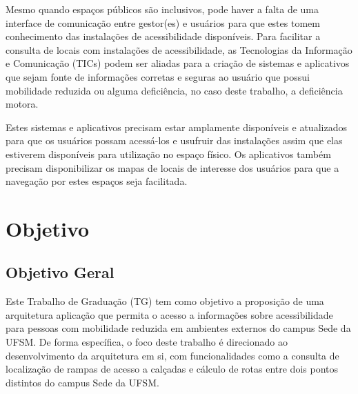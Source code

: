 \documentclass[oneside,openright,12pt]{ufsm_2015} %
\begin{document}
Mesmo quando espaços públicos são inclusivos, pode haver a falta de uma interface de comunicação entre gestor(es) e usuários para que estes tomem conhecimento das instalações de acessibilidade disponíveis.
Para facilitar a consulta de locais com instalações de acessibilidade, as Tecnologias da Informação e Comunicação (TICs) podem ser aliadas para a criação de sistemas e aplicativos que sejam fonte de informações corretas e seguras ao usuário que possui mobilidade reduzida ou alguma deficiência, no caso deste trabalho, a deficiência motora.

Estes sistemas e aplicativos precisam estar amplamente disponíveis e atualizados para que os usuários possam acessá-los e usufruir das instalações assim que elas estiverem disponíveis para utilização no espaço físico. Os aplicativos também precisam disponibilizar os mapas de locais de interesse dos usuários para que a navegação por estes espaços seja facilitada.

\section{Objetivo}

\subsection{Objetivo Geral}
Este Trabalho de Graduação (TG) tem como objetivo a proposição de uma arquitetura aplicação que permita o acesso a informações sobre acessibilidade para pessoas com mobilidade reduzida em ambientes externos do campus Sede da UFSM. 
De forma específica, o foco deste trabalho é direcionado ao desenvolvimento da arquitetura em si, com funcionalidades como a consulta de localização de rampas de acesso a calçadas e cálculo de rotas entre dois pontos distintos do campus Sede da UFSM. 
\end{document}

